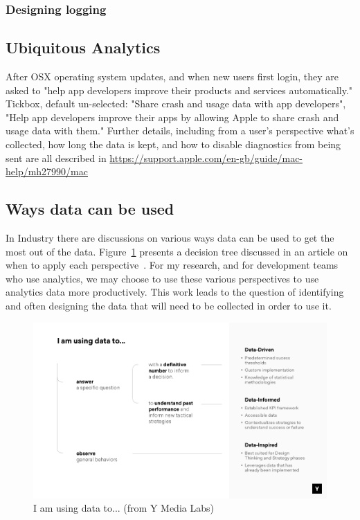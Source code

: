 \subsubsection{Designing logging}

\subsection{Ubiquitous Analytics}
After OSX operating system updates, and when new users first login, they are asked to "help app developers improve their products and services automatically." Tickbox, default un-selected: "Share crash and usage data with app developers", "Help app developers improve their apps by allowing Apple to share crash and usage data with them." Further details, including from a user's perspective what's collected, how long the data is kept, and how to disable diagnostics from being sent are all described in \url{https://support.apple.com/en-gb/guide/mac-help/mh27990/mac}

\subsection{Ways data can be used}
In Industry there are discussions on various ways data can be used to get the most out of the data. Figure~\ref{fig:i_am_using_data_to} presents a decision tree discussed in an article on when to apply each perspective~\cite{amplitude_are_you_data_driven}. For my research, and for development teams who use analytics, we may choose to use these various perspectives to use analytics data more productively. This work leads to the question of identifying and often designing the data that will need to be collected in order to use it.

\begin{figure}[!htbp]
    \centering
    \includegraphics[width=15cm]{images/data-informed-graphic-ymedia-labs.png}
    \caption{I am using data to... (from Y Media Labs)~\cite{amplitude_are_you_data_driven}}
    \label{fig:i_am_using_data_to}
\end{figure}

